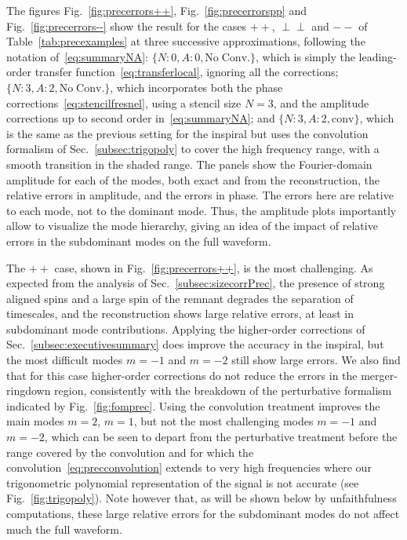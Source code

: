 \documentclass[aps,showpacs,twocolumn,
prd,superscriptaddress,nofootinbib]{revtex4-1}
\begin{document}
The figures Fig.~\ref{fig:precerrors++}, Fig.~\ref{fig:precerrorspp} and Fig.~\ref{fig:precerrors--} show the result for the cases $++$, $\perp\perp$ and $--$ of Table~\ref{tab:precexamples} at three successive approximations, following the notation of~\eqref{eq:summaryNA}: $\{N:0,A:0, \mathrm{No \; Conv.}\}$, which is simply the leading-order transfer function~\eqref{eq:transferlocal}, ignoring all the corrections; $\{N:3,A:2, \mathrm{No \; Conv.}\}$, which incorporates both the phase corrections~\eqref{eq:stencilfresnel}, using a stencil size $N=3$, and the amplitude corrections up to second order in~\eqref{eq:summaryNA}; and $\{N:3,A:2,\text{conv}\}$, which is the same as the previous setting for the inspiral but uses the convolution formalism of Sec.~\ref{subsec:trigopoly} to cover the high frequency range, with a smooth transition in the shaded range. The panels show the Fourier-domain amplitude for each of the modes, both exact and from the reconstruction, the relative errors in amplitude, and the errors in phase. The errors here are relative to each mode, not to the dominant mode. Thus, the amplitude plots importantly allow to visualize the mode hierarchy, giving an idea of the impact of relative errors in the subdominant modes on the full waveform.

The $++$ case, shown in Fig.~\ref{fig:precerrors++}, is the most challenging. As expected from the analysis of Sec.~\ref{subsec:sizecorrPrec}, the presence of strong aligned spins and a large spin of the remnant degrades the separation of timescales, and the reconstruction shows large relative errors, at least in subdominant mode contributions. Applying the higher-order corrections of Sec.~\ref{subsec:executivesummary} does improve the accuracy in the inspiral, but the most difficult modes $m=-1$ and $m=-2$ still show large errors. We also find that for this case higher-order corrections do not reduce the errors in the merger-ringdown region, consistently with the breakdown of the perturbative formalism indicated by Fig.~\ref{fig:fomprec}. Using the convolution treatment improves the main modes $m=2$, $m=1$, but not the most challenging modes $m=-1$ and $m=-2$, which can be seen to depart from the perturbative treatment before the range covered by the convolution and for which the convolution~\eqref{eq:precconvolution} extends to very high frequencies where our trigonometric polynomial representation of the signal is not accurate (see Fig.~\ref{fig:trigopoly}). Note however that, as will be shown below by unfaithfulness computations, these large relative errors for the subdominant modes do not affect much the full waveform.
\end{document}
